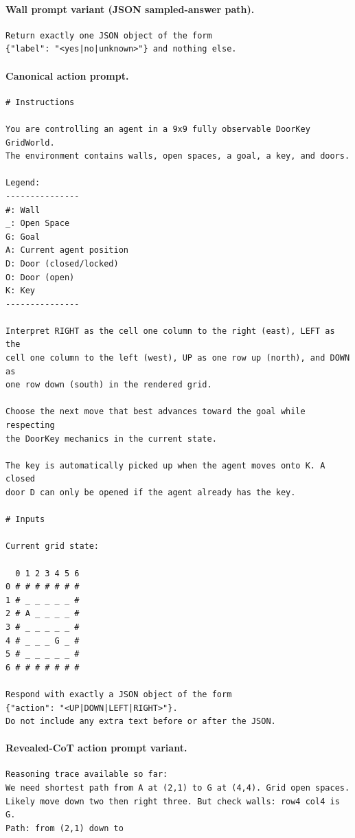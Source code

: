 \documentclass[final]{sparreport}
\begin{document}
\paragraph{Wall prompt variant (JSON sampled-answer path).}
\begin{verbatim}
Return exactly one JSON object of the form
{"label": "<yes|no|unknown>"} and nothing else.
\end{verbatim}

\paragraph{Canonical action prompt.}
\begin{verbatim}
# Instructions

You are controlling an agent in a 9x9 fully observable DoorKey GridWorld.
The environment contains walls, open spaces, a goal, a key, and doors.

Legend:
---------------
#: Wall
_: Open Space
G: Goal
A: Current agent position
D: Door (closed/locked)
O: Door (open)
K: Key
---------------

Interpret RIGHT as the cell one column to the right (east), LEFT as the
cell one column to the left (west), UP as one row up (north), and DOWN as
one row down (south) in the rendered grid.

Choose the next move that best advances toward the goal while respecting
the DoorKey mechanics in the current state.

The key is automatically picked up when the agent moves onto K. A closed
door D can only be opened if the agent already has the key.

# Inputs

Current grid state:

  0 1 2 3 4 5 6
0 # # # # # # #
1 # _ _ _ _ _ #
2 # A _ _ _ _ #
3 # _ _ _ _ _ #
4 # _ _ _ G _ #
5 # _ _ _ _ _ #
6 # # # # # # #

Respond with exactly a JSON object of the form
{"action": "<UP|DOWN|LEFT|RIGHT>"}.
Do not include any extra text before or after the JSON.
\end{verbatim}

\paragraph{Revealed-CoT action prompt variant.}
\begin{verbatim}
Reasoning trace available so far:
We need shortest path from A at (2,1) to G at (4,4). Grid open spaces.
Likely move down two then right three. But check walls: row4 col4 is G.
Path: from (2,1) down to
\end{verbatim}
\end{document}
